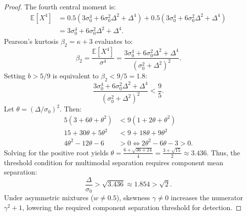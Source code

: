 \documentclass[10pt,journal,compsoc]{IEEEtran}
\begin{document}
\begin{proof}
The fourth central moment is:
\begin{align}
    \mathbb{E}[X^4] &= 0.5 \left(3\sigma_0^4 + 6\sigma_0^2 \Delta^2 + \Delta^4\right) + 0.5 \left(3\sigma_0^4 + 6\sigma_0^2 \Delta^2 + \Delta^4\right) \nonumber \\
    &= 3\sigma_0^4 + 6\sigma_0^2 \Delta^2 + \Delta^4.
\end{align}
Pearson's kurtosis $\beta_2 = \kappa + 3$ evaluates to:
\begin{equation}
    \beta_2 = \frac{\mathbb{E}[X^4]}{\sigma^4} = \frac{3\sigma_0^4 + 6\sigma_0^2 \Delta^2 + \Delta^4}{(\sigma_0^2 + \Delta^2)^2}.
\end{equation}
Setting $b > 5/9$ is equivalent to $\beta_2 < 9/5 = 1.8$:
\begin{equation}
    \frac{3\sigma_0^4 + 6\sigma_0^2 \Delta^2 + \Delta^4}{(\sigma_0^2 + \Delta^2)^2} < \frac{9}{5}.
\end{equation}
Let $\theta = (\Delta / \sigma_0)^2$. Then:
\begin{align}
    5(3 + 6\theta + \theta^2) &< 9(1 + 2\theta + \theta^2) \nonumber \\
    15 + 30\theta + 5\theta^2 &< 9 + 18\theta + 9\theta^2 \nonumber \\
    4\theta^2 - 12\theta - 6 &> 0 \iff 2\theta^2 - 6\theta - 3 > 0.
\end{align}
Solving for the positive root yields $\theta = \frac{6 + \sqrt{36 + 24}}{4} = \frac{3 + \sqrt{15}}{2} \approx 3.436$. Thus, the threshold condition for multimodal separation requires component mean separation:
\begin{equation}
    \frac{\Delta}{\sigma_0} > \sqrt{3.436} \approx 1.854 > \sqrt{2}.
\end{equation}
Under asymmetric mixtures ($w \neq 0.5$), skewness $\gamma \neq 0$ increases the numerator $\gamma^2 + 1$, lowering the required component separation threshold for detection.
\end{proof}
\end{document}
